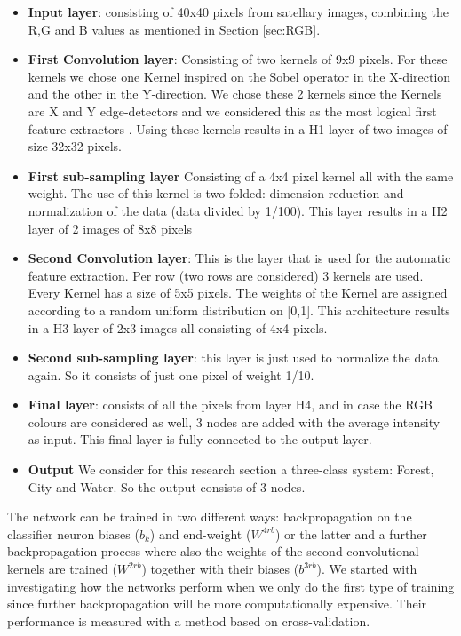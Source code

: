 \documentclass[a4paper,onecolumn]{report}
\begin{document}
\begin{itemize}
\item \textbf{Input layer}: consisting of 40x40 pixels from satellary images, combining the R,G and B values as mentioned in Section \ref{sec:RGB}.
\item \textbf{First Convolution layer}: Consisting of two kernels of 9x9 pixels. For these kernels we chose one Kernel inspired on the Sobel operator in the X-direction and the other in the Y-direction. We chose these 2 kernels since the Kernels are X and Y edge-detectors and we considered this as the most logical first feature extractors \cite{kanopoulos1988design}. Using these kernels results in a H1 layer of two images of size 32x32 pixels.
\item \textbf{First sub-sampling layer} Consisting of a 4x4 pixel kernel all with the same weight. The use of this kernel is two-folded: dimension reduction and normalization of the data (data divided by 1/100). This layer results in a H2 layer of 2 images of 8x8 pixels
\item \textbf{Second Convolution layer}: This is the layer that is used for the automatic feature extraction. Per row (two rows are considered) 3 kernels are used. Every Kernel has a size of 5x5 pixels. The weights of the Kernel are assigned according to a random uniform distribution on [0,1]. This architecture results in a H3 layer of 2x3 images all consisting of 4x4 pixels.
\item \textbf{Second sub-sampling layer}: this layer is just used to normalize the data again. So it consists of just one pixel of weight 1/10. 
\item \textbf{Final layer}: consists of all the pixels from layer H4, and in case the RGB colours are considered as well, 3 nodes are added with the average intensity as input. This final layer is fully connected to the output layer. 
\item \textbf{Output} We consider for this research section a three-class system: Forest, City and Water. So the output consists of 3 nodes.
\end{itemize} 

The network can be trained in two different ways: backpropagation on the classifier neuron biases ($b_{k}$) and end-weight ($ W^{4rb}$) or the latter and a further backpropagation process where also the weights of the second convolutional kernels are trained ($ W^{2rb} $) together with their biases ($b^{3rb}$). We started with investigating how the networks perform when we only do the first type of training since further backpropagation will be more computationally expensive. Their performance is measured with a method based on cross-validation.\\
\end{document}
